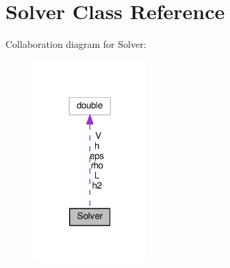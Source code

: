 \hypertarget{classSolver}{}\section{Solver Class Reference}
\label{classSolver}


Collaboration diagram for Solver\+:
\nopagebreak
\begin{figure}[H]
\begin{center}
\leavevmode
\includegraphics[width=125pt]{classSolver__coll__graph}
\end{center}
\end{figure}
